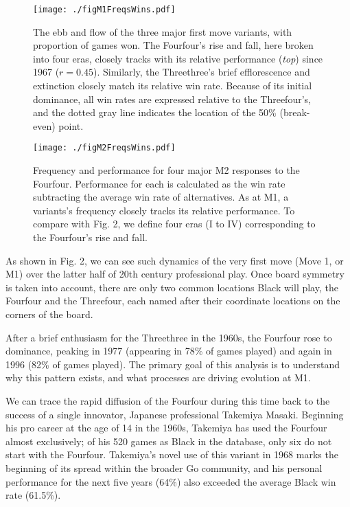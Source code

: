 \documentclass[reqno,12pt]{amsart}
\begin{document}
\begin{figure}[t]
  \begin{center}
    \texttt{[image: ./figM1FreqsWins.pdf]}
    \caption{The ebb and flow of the three major first move variants, with proportion of games won. The Fourfour's rise and fall, here broken into four eras, closely tracks with its relative performance (\textit{top}) since 1967 ($r=0.45$). Similarly, the Threethree's brief efflorescence and extinction closely match its relative win rate. Because of its initial dominance, all win rates are expressed relative to the Threefour's, and the dotted gray line indicates the location of the 50\% (break-even) point.}
    \label{FigM1FreqsWins}
  \end{center}
\end{figure}

\begin{figure}[t]
  \begin{center}
    \texttt{[image: ./figM2FreqsWins.pdf]}
    \caption{Frequency and performance for four major M2 responses to the Fourfour. Performance for each is calculated as the win rate subtracting the average win rate of alternatives. As at M1, a variants's frequency closely tracks its relative performance. To compare with Fig. 2, we define four eras (I to IV) corresponding to the Fourfour's rise and fall.}
    \label{FigM2FreqsWins}
  \end{center}
\end{figure}

\clearpage

As shown in Fig. 2, we can see such dynamics of the very first move
(Move 1, or M1) over the latter half of 20th century professional play.
Once board symmetry is taken into account, there are only two common
locations Black will play, the Fourfour and the Threefour, each named
after their coordinate locations on the corners of the board.

After a brief enthusiasm for the Threethree in the 1960s, the Fourfour
rose to dominance, peaking in 1977 (appearing in 78\% of games played)
and again in 1996 (82\% of games played). The primary goal of this
analysis is to understand why this pattern exists, and what processes
are driving evolution at M1.

We can trace the rapid diffusion of the Fourfour during this time back
to the success of a single innovator, Japanese professional Takemiya
Masaki. Beginning his pro career at the age of 14 in the 1960s, Takemiya
has used the Fourfour almost exclusively; of his 520 games as Black in
the database, only six do not start with the Fourfour. Takemiya's novel
use of this variant in 1968 marks the beginning of its spread within the
broader Go community, and his personal performance for the next five
years (64\%) also exceeded the average Black win rate (61.5\%).
\end{document}
